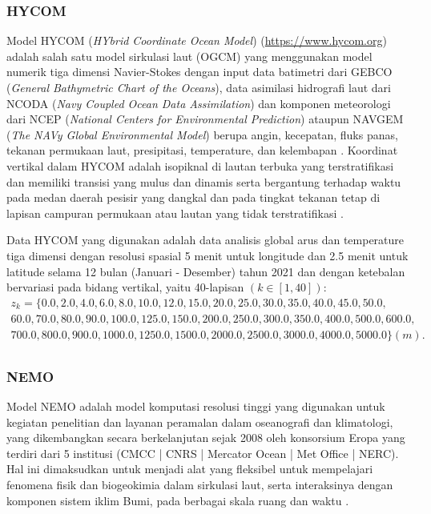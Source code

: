 \begin{spacing}{1.5}
\subsubsection[HYCOM]{HYCOM}
	Model HYCOM (\textit{HYbrid Coordinate Ocean Model}) (\href{https://www.hycom.org}{https://www.hycom.org}) adalah salah satu model sirkulasi laut (OGCM) yang menggunakan model numerik tiga dimensi Navier-Stokes dengan input data batimetri dari GEBCO (\textit{General Bathymetric Chart of the Oceans}), data asimilasi hidrografi laut dari NCODA (\textit{Navy Coupled Ocean Data Assimilation}) dan komponen meteorologi dari NCEP (\textit{National Centers for Environmental Prediction}) ataupun NAVGEM (\textit{The NAVy Global Environmental Model}) berupa angin, kecepatan, fluks panas, tekanan permukaan laut, presipitasi, temperature, dan kelembapan . Koordinat vertikal dalam HYCOM adalah isopiknal di lautan terbuka yang terstratifikasi dan memiliki transisi yang mulus dan dinamis serta bergantung terhadap waktu pada medan daerah pesisir yang dangkal dan pada tingkat tekanan tetap di lapisan campuran permukaan atau lautan yang tidak terstratifikasi . 
	\par Data HYCOM yang digunakan adalah data analisis global arus dan temperature tiga dimensi dengan resolusi spasial 5 menit untuk longitude dan 2.5 menit untuk latitude selama 12 bulan (Januari - Desember) tahun 2021 dan dengan ketebalan bervariasi pada bidang vertikal, yaitu 40-lapisan $(k \in [1,40])$:
	\begin{equation*}
		\begin{aligned}
			z_k = \{0.0, 2.0, 4.0, 6.0, 8.0, 10.0, 12.0, 15.0, 20.0, 25.0, 30.0, 35.0, 40.0, 45.0, 50.0, \\
			60.0, 70.0,	80.0, 90.0, 100.0, 125.0, 150.0, 200.0, 250.0, 300.0, 350.0, 400.0, 500.0, 600.0,\\
			700.0, 800.0, 900.0, 1000.0, 1250.0, 1500.0, 2000.0, 2500.0, 3000.0, 4000.0, 5000.0\} (m). \\
		\end{aligned}
	\end{equation*}

\subsubsection[NEMO]{NEMO}
	Model NEMO adalah model komputasi resolusi tinggi yang digunakan untuk kegiatan penelitian dan layanan peramalan dalam oseanografi dan klimatologi, yang dikembangkan secara berkelanjutan sejak 2008 oleh konsorsium Eropa yang terdiri dari 5 institusi (CMCC | CNRS | Mercator Ocean | Met Office | NERC). Hal ini dimaksudkan untuk menjadi alat yang fleksibel untuk mempelajari fenomena fisik dan biogeokimia dalam sirkulasi laut, serta interaksinya dengan komponen sistem iklim Bumi, pada berbagai skala ruang dan waktu . 
	

\end{spacing}
